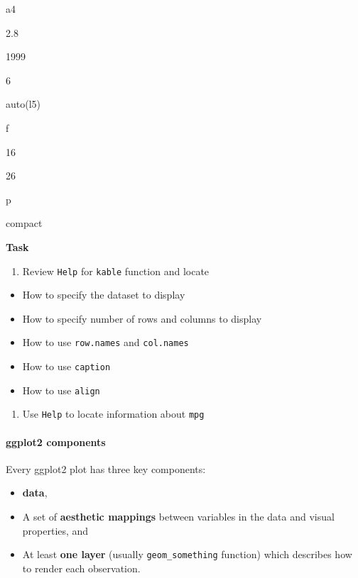 \documentclass[
]{article}
\providecommand{\tightlist}{%
  \setlength{\itemsep}{0pt}\setlength{\parskip}{0pt}}
\begin{document}
a4

2.8

1999

6

auto(l5)

f

16

26

p

compact

\textbf{Task}

\begin{enumerate}
\def\labelenumi{\arabic{enumi}.}
\tightlist
\item
  Review \texttt{Help} for \texttt{kable} function and locate
\end{enumerate}

\begin{itemize}
\item
  How to specify the dataset to display
\item
  How to specify number of rows and columns to display
\item
  How to use \texttt{row.names} and \texttt{col.names}
\item
  How to use \texttt{caption}
\item
  How to use \texttt{align}
\end{itemize}

\begin{enumerate}
\def\labelenumi{\arabic{enumi}.}
\setcounter{enumi}{1}
\tightlist
\item
  Use \texttt{Help} to locate information about \texttt{mpg}
\end{enumerate}

\hypertarget{ggplot2-components}{%
\paragraph{ggplot2 components}\label{ggplot2-components}}

Every ggplot2 plot has three key components:

\begin{itemize}
\item
  \textbf{data},
\item
  A set of \textbf{aesthetic mappings} between variables in the data and
  visual properties, and
\item
  At least \textbf{one layer} (usually \texttt{geom\_something}
  function) which describes how to render each observation.
\end{itemize}
\end{document}
